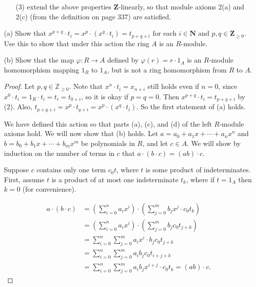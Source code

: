 \documentclass[10pt]{article}
\newcommand{\Z}{\mathbb{Z}}
\begin{document}
\begin{enumerate}
\begin{itemize}
\item[(3)] extend the above properties $\mathbf{Z}$-linearly, so that module axioms 2(a) and 2(c) (from the definition on page 337) are satisfied.
\end{itemize}


(a) Show that $x^{p+q} \cdot t_i = x^p \cdot (x^q \cdot t_i) = t_{p+q+i}$ for each $i \in \mathbf{N}$ and $p,q \in \mathbf{Z}_{\geq 0}$.  Use this to show that under this action the ring $A$ is an $R$-module.

(b) Show that the map $\varphi: R \rightarrow A$ defined by $\varphi(r) = r \cdot 1_A$ is an $R$-module homomorphism mapping $1_R$ to $1_A$, but is not a ring homomorphism from $R$ to $A$.

\begin{proof}
Let $p,q \in \Z_{\geq 0}$.  Note that $x^n \cdot t_i = x_{n+i}$ still holds even if $n = 0$, since $x^0 \cdot t_i = 1_R \cdot t_i = t_i = t_{0+i}$, so it is okay if $p = q = 0$.  Then $x^{p+q} \cdot t_i = t_{p+q+i}$ by (2).  Also, $t_{p+q+i} = x^p \cdot t_{q+i} = x^p \cdot (x^q \cdot t_i)$.  So the first statement of (a) holds.

We have defined this action so that parts (a), (c), and (d) of the left $R$-module axioms hold.  We will now show that (b) holds.  Let $a = a_0 + a_1x + \cdots + a_n x^n$ and $b = b_0 + b_1x + \cdots + b_m x^m$ be polynomials in $R$, and let $c \in A$.  We will show by induction on the number of terms in $c$ that $a\cdot (b \cdot c) = (ab) \cdot c$.

Suppose $c$ contains only one term $c_0 t$, where $t$ is some product of indeterminates.  First, assume $t$ is a product of at most one indeterminate $t_k$, where if $t=1_A$ then $k=0$ (for convenience).

\begin{align*}
a \cdot (b \cdot c) &= \left( \sum\limits_{i=0}^n a_ix^i \right) \cdot \left( \sum\limits_{j=0}^m b_jx^j \cdot c_0 t_k \right)
\\
&= \left( \sum\limits_{i=0}^n a_ix^i \right) \cdot \left( \sum\limits_{j=0}^m b_j c_0 t_{j+k} \right)
\\
&= \sum\limits_{i=0}^n \sum\limits_{j=0}^m a_ix^i \cdot b_j c_0 t_{j+k}
\\
&= \sum\limits_{i=0}^n \sum\limits_{j=0}^m a_i b_j c_0 t_{i+j+k}
\\
&= \sum\limits_{i=0}^n \sum\limits_{j=0}^m a_i b_j x^{i+j} \cdot c_0 t_{k}
= (a b) \cdot c.
\end{align*}


\end{proof}
\end{enumerate}
\end{document}
